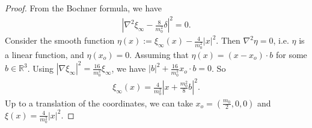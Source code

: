 \documentclass[letter]{amsart}
\theoremstyle{definition}
\theoremstyle{remark}
\begin{document}
\begin{proof}
	From the Bochner formula, we have
	\begin{align*}
		|\nabla ^2 \xi _\infty - \frac{8}{m_0^2} \delta |^2 =0.
	\end{align*}
Consider the smooth function $\eta (x):= \xi _\infty(x) - \frac{4}{m_0^2}|x|^2$. Then $\nabla ^2 \eta =0$, i.e. $\eta $ is a linear function, and $\eta (x_o) =0$. Assuming that $\eta (x) = (x-x_o)\cdot b$ for some $b \in \mathbb{R}^3$. Using $|\nabla \xi _\infty |^2 = \frac{16}{m_0^2} \xi _\infty$, we have $|b|^2 + \frac{16}{m_0^2} x_o \cdot b =0$. So 
\begin{align*}
	\xi _\infty(x) = \frac{4}{m_0^2} \left| x + \frac{m_0^2}{8}b\right|^2.
\end{align*}
Up to a translation of the coordinates, we can take $x_o = (\frac{m_0}{2}, 0, 0)$ and $\xi (x) = \frac{4}{m_0^2}|x|^2$.

\end{proof}
\end{document}
